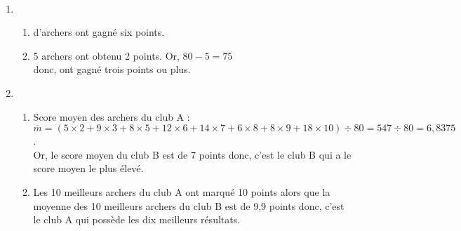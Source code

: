 \begin{corrige}
   \ \\ [-5mm]
   \begin{enumerate}
      \item
      \begin{enumerate}
         \item { d'archers} ont gagné six points.
         \item 5 archers ont obtenu 2 points. Or, $80-5 =75$ \\
            donc, { ont gagné trois points ou plus}.
      \end{enumerate}
      \setcounter{enumi}{1}
      \item 
      \begin{enumerate}
         \item Score moyen des archers du club A : \\
            $\overline{m} =(5\times2+9\times3+8\times5+12\times6+14\times7+6\times8+8\times9+18\times10)\div80 =547\div80 =6,8375$. \\
            Or, le score moyen du club B est de 7 points donc, c'est {\red le club B} qui a le score moyen le plus élevé.
         \item Les 10 meilleurs archers du club A ont marqué 10 points alors que la moyenne des 10 meilleurs archers du club B est de 9,9 points donc, c'est {\red le club A} qui possède les dix meilleurs résultats.
      \end{enumerate}
   \end{enumerate}
\end{corrige}
